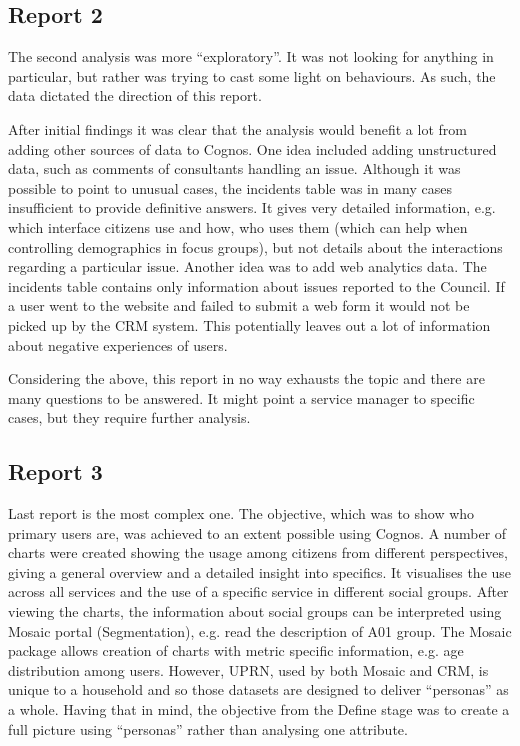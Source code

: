 		\subsection{Report 2}
		
The second analysis was more “exploratory”. It was not looking for anything in particular, but rather was trying to cast some light on behaviours. As such, the data dictated the direction of this report.

After initial findings it was clear that the analysis would benefit a lot from adding other sources of data to Cognos. One idea included adding unstructured data, such as comments of consultants handling an issue. Although it was possible to point to unusual cases, the incidents table was in many cases insufficient to provide definitive answers. It gives very detailed information, e.g. which interface citizens use and how, who uses them (which can help when controlling demographics in focus groups), but not details about the interactions regarding a particular issue. Another idea was to add web analytics data. The incidents table contains only information about issues reported to the Council. If a user went to the website and failed to submit a web form it would not be picked up by the CRM system. This potentially leaves out a lot of information about negative experiences of users.

Considering the above, this report in no way exhausts the topic and there are many questions to be answered. It might point a service manager to specific cases, but they require further analysis.
		
		\subsection{Report 3}
		
Last report is the most complex one. The objective, which was to show who primary users are, was achieved to an extent possible using Cognos. A number of charts were created showing the usage among citizens from different perspectives, giving a general overview and a detailed insight into specifics. It visualises the use across all services and the use of a specific service in different social groups. After viewing the charts, the information about social groups can be interpreted using Mosaic portal (Segmentation), e.g. read the description of A01 group. The Mosaic package allows creation of charts with metric specific information, e.g. age distribution among users. However, UPRN, used by both Mosaic and CRM, is unique to a household and so those datasets are designed to deliver “personas” as a whole. Having that in mind, the objective from the Define stage was to create a full picture using “personas” rather than analysing one attribute.

